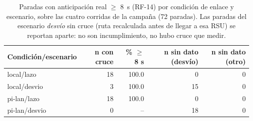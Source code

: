 \begin{table}[H]
\centering
\caption{Paradas con anticipación real $\geq$ 8~s (RF-14) por condición de enlace y escenario, sobre las cuatro corridas de la campaña (72 paradas). Las paradas del escenario \emph{desvío} sin cruce (ruta recalculada antes de llegar a esa RSU) se reportan aparte: no son incumplimiento, no hubo cruce que medir.}
\label{tab:cumplimiento_rf8}
\small
\begin{tabular}{lrrrr}
\toprule
\textbf{Condición/escenario} & \textbf{n con cruce} & \textbf{\% $\geq$ 8 s} & \textbf{n sin dato (desvío)} & \textbf{n sin dato (otro)} \\
\midrule
local/lazo & 18 & 100.0 & 0 & 0 \\
local/desvio & 3 & 100.0 & 15 & 0 \\
pi-lan/lazo & 18 & 100.0 & 0 & 0 \\
pi-lan/desvio & 0 & -- & 18 & 0 \\
\bottomrule
\end{tabular}
\end{table}
